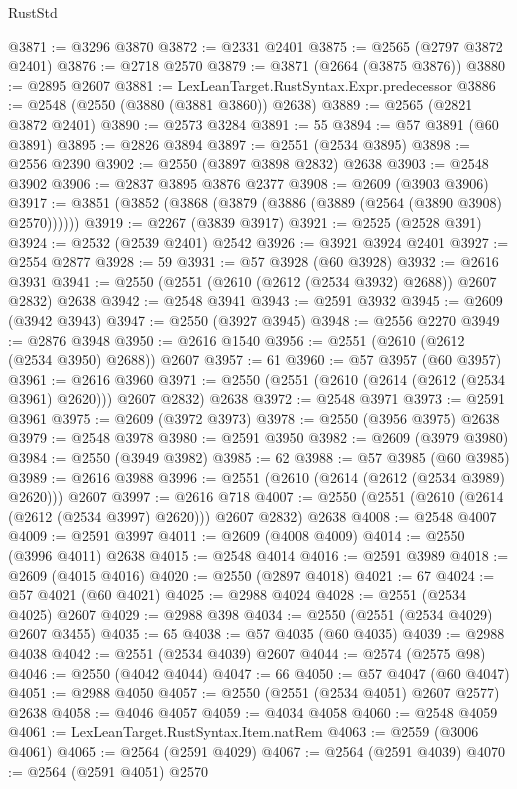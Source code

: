 \begin{lexlean}{RustStd}
\begin{coremodule}
@3871 := @3296 @3870
@3872 := @2331 @2401
@3875 := @2565 (@2797 @3872 @2401)
@3876 := @2718 @2570
@3879 := @3871 (@2664 (@3875 @3876))
@3880 := @2895 @2607
@3881 := LexLeanTarget.RustSyntax.Expr.predecessor
@3886 := @2548 (@2550 (@3880 (@3881 @3860)) @2638)
@3889 := @2565 (@2821 @3872 @2401)
@3890 := @2573 @3284
@3891 := 55
@3894 := @57 @3891 (@60 @3891)
@3895 := @2826 @3894
@3897 := @2551 (@2534 @3895)
@3898 := @2556 @2390
@3902 := @2550 (@3897 @3898 @2832) @2638
@3903 := @2548 @3902
@3906 := @2837 @3895 @3876 @2377
@3908 := @2609 (@3903 @3906)
@3917 := @3851 (@3852 (@3868 (@3879 (@3886 (@3889 (@2564 (@3890 @3908) @2570))))))
@3919 := @2267 (@3839 @3917)
@3921 := @2525 (@2528 @391)
@3924 := @2532 (@2539 @2401) @2542
@3926 := @3921 @3924 @2401
@3927 := @2554 @2877
@3928 := 59
@3931 := @57 @3928 (@60 @3928)
@3932 := @2616 @3931
@3941 := @2550 (@2551 (@2610 (@2612 (@2534 @3932) @2688)) @2607 @2832) @2638
@3942 := @2548 @3941
@3943 := @2591 @3932
@3945 := @2609 (@3942 @3943)
@3947 := @2550 (@3927 @3945)
@3948 := @2556 @2270
@3949 := @2876 @3948
@3950 := @2616 @1540
@3956 := @2551 (@2610 (@2612 (@2534 @3950) @2688)) @2607
@3957 := 61
@3960 := @57 @3957 (@60 @3957)
@3961 := @2616 @3960
@3971 := @2550 (@2551 (@2610 (@2614 (@2612 (@2534 @3961) @2620))) @2607 @2832) @2638
@3972 := @2548 @3971
@3973 := @2591 @3961
@3975 := @2609 (@3972 @3973)
@3978 := @2550 (@3956 @3975) @2638
@3979 := @2548 @3978
@3980 := @2591 @3950
@3982 := @2609 (@3979 @3980)
@3984 := @2550 (@3949 @3982)
@3985 := 62
@3988 := @57 @3985 (@60 @3985)
@3989 := @2616 @3988
@3996 := @2551 (@2610 (@2614 (@2612 (@2534 @3989) @2620))) @2607
@3997 := @2616 @718
@4007 := @2550 (@2551 (@2610 (@2614 (@2612 (@2534 @3997) @2620))) @2607 @2832) @2638
@4008 := @2548 @4007
@4009 := @2591 @3997
@4011 := @2609 (@4008 @4009)
@4014 := @2550 (@3996 @4011) @2638
@4015 := @2548 @4014
@4016 := @2591 @3989
@4018 := @2609 (@4015 @4016)
@4020 := @2550 (@2897 @4018)
@4021 := 67
@4024 := @57 @4021 (@60 @4021)
@4025 := @2988 @4024
@4028 := @2551 (@2534 @4025) @2607
@4029 := @2988 @398
@4034 := @2550 (@2551 (@2534 @4029) @2607 @3455)
@4035 := 65
@4038 := @57 @4035 (@60 @4035)
@4039 := @2988 @4038
@4042 := @2551 (@2534 @4039) @2607
@4044 := @2574 (@2575 @98)
@4046 := @2550 (@4042 @4044)
@4047 := 66
@4050 := @57 @4047 (@60 @4047)
@4051 := @2988 @4050
@4057 := @2550 (@2551 (@2534 @4051) @2607 @2577) @2638
@4058 := @4046 @4057
@4059 := @4034 @4058
@4060 := @2548 @4059
@4061 := LexLeanTarget.RustSyntax.Item.natRem
@4063 := @2559 (@3006 @4061)
@4065 := @2564 (@2591 @4029)
@4067 := @2564 (@2591 @4039)
@4070 := @2564 (@2591 @4051) @2570

\end{coremodule}
\end{lexlean}
